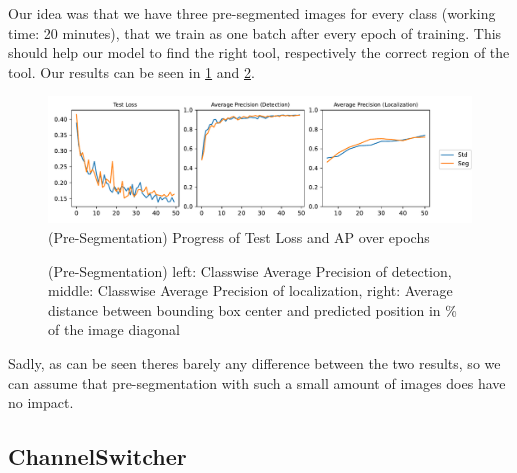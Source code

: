 Our idea was that we have three pre-segmented images for every class (working time: 20 minutes), that we train as one batch after every epoch of training. This should help our model to find the right tool, respectively the correct region of the tool. Our results can be seen in \ref{fig:seg_aps} and \ref{fig:seg_distances}.\\


\begin{figure}[h]
	\centering
	\includegraphics[width=15cm]{4_experiments/images/5_seg/APs.pdf}
	\caption{(Pre-Segmentation) Progress of Test Loss and AP over epochs}
	\label{fig:seg_aps}
\end{figure}

\begin{figure}[h]
	\centering
	\caption{(Pre-Segmentation) left: Classwise Average Precision of detection, middle: Classwise Average Precision of localization, right: Average distance between bounding box center and predicted position in \% of the image diagonal}
	\label{fig:seg_distances}
\end{figure}

Sadly, as can be seen theres barely any difference between the two results, so we can assume that pre-segmentation with such a small amount of images does have no impact.

\FloatBarrier
\subsection{ChannelSwitcher}

